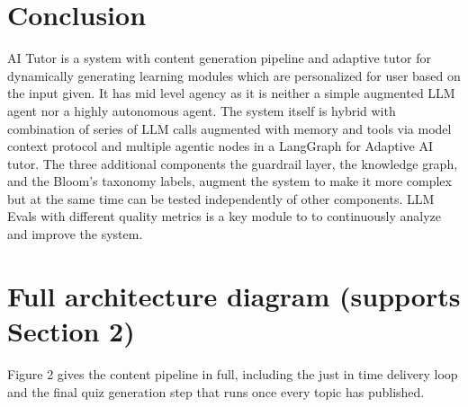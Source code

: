 \documentclass{ecai}
\begin{document}
\section{Conclusion}

AI Tutor is a system with content generation pipeline and adaptive tutor
for dynamically generating learning modules which are personalized for 
user based on the input given. It has mid level  agency as it is neither a simple 
augmented LLM agent nor a highly autonomous agent. The system itself is hybrid 
with combination of series of LLM calls augmented with memory and tools 
via  model context protocol and multiple agentic nodes in a LangGraph for 
Adaptive AI tutor. The three additional components the guardrail layer, the 
knowledge graph, and the Bloom's taxonomy labels, augment the system to
make it more complex but at the same time can be tested independently of
other components. LLM Evals with different quality metrics is a key module to 
to continuously analyze and improve the system.



\clearpage


\section{Full architecture diagram (supports Section 2)}

Figure 2 gives the content pipeline in full, including the just in time
delivery loop and the final quiz generation step that runs once every topic
has published.
\end{document}

